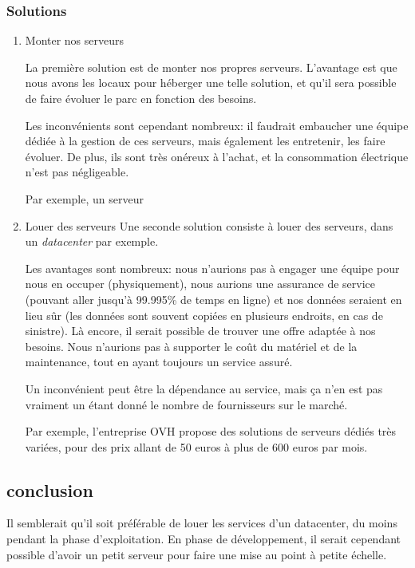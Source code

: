    \subsubsection{Solutions}
        \begin{enumerate}
            \item Monter nos serveurs
            
            La première solution est de monter nos propres serveurs.
            L'avantage est que nous avons les locaux pour héberger une
            telle solution, et qu'il sera possible de faire évoluer
            le parc en fonction des besoins.
    
            Les inconvénients sont cependant nombreux: il faudrait
            embaucher une équipe dédiée à la gestion de ces serveurs,
            mais également les entretenir,
            les faire évoluer. De plus, ils sont très onéreux à l'achat,
            et la consommation électrique n'est pas négligeable.
            
            Par exemple, un serveur

            \item Louer des serveurs
            Une seconde solution consiste à louer des serveurs,
            dans un \textsl{datacenter} par exemple.

            Les avantages sont nombreux: nous n'aurions pas
            à engager une équipe pour
            nous en occuper (physiquement), nous aurions une
            assurance de service
            (pouvant aller jusqu'à 99.995\% de temps en ligne)
            et nos données seraient
            en lieu sûr (les données sont souvent copiées en
            plusieurs endroits, en cas de sinistre). Là encore,
            il serait possible de trouver une offre adaptée à nos besoins.
            Nous n'aurions pas à supporter le coût du matériel et de la 
            maintenance, tout en ayant toujours un service assuré.

            Un inconvénient peut être la dépendance au service, mais ça
            n'en est pas vraiment un étant donné le nombre de
            fournisseurs sur le marché.

            Par exemple, l'entreprise OVH propose des solutions
            de serveurs dédiés très variées, pour des prix allant
            de 50 euros à plus de 600 euros par mois.

        \end{enumerate}
    \subsection{conclusion}
    Il semblerait qu'il soit préférable de louer les services d'un datacenter, du moins pendant la phase d'exploitation. En phase de développement,
il serait cependant possible d'avoir un petit serveur pour faire une mise au point à petite échelle.
%
\vfill
\pagebreak
